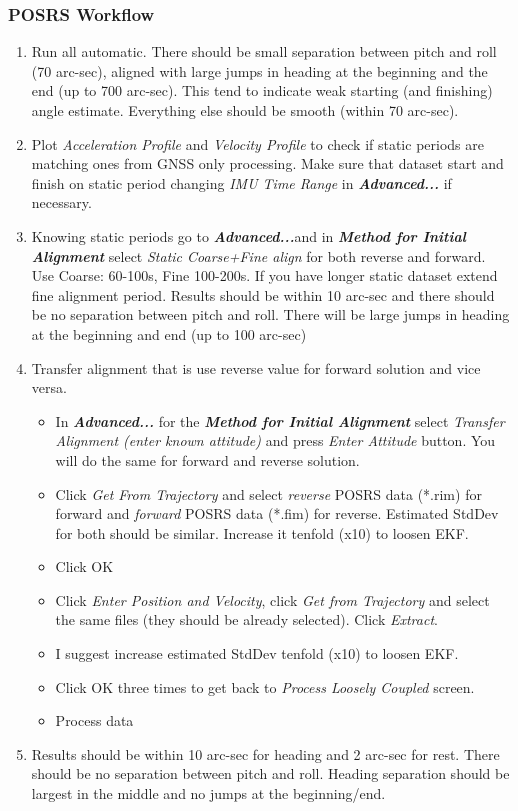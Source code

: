\documentclass[british,DIV=calc, paper=a4, fontsize=12pt, onecolumn]{scrartcl}
\begin{document}
\subsubsection{POSRS Workflow\label{sub:POSRS-Workflow}}

\begin{enumerate}
	\item Run all automatic. There should be small separation between pitch and roll (70 arc-sec), aligned with large jumps in heading at the beginning and the end (up to 700 arc-sec). This tend to indicate weak starting (and finishing) angle estimate. Everything else should be smooth (within 70 arc-sec).
	\item Plot \emph{Acceleration Profile} and \emph{Velocity Profile} to check if static periods are matching ones from GNSS only processing. Make sure that dataset start and finish on static period changing \textit{IMU Time Range} in \textbf{\emph{Advanced...}} if necessary.
	\item Knowing static periods go to \textbf{\emph{Advanced...}}and in \textbf{\emph{Method for Initial Alignment}} select \emph{Static Coarse+Fine align} for both reverse and forward. Use Coarse: 60-100s, Fine 100-200s. If you have longer static dataset extend fine alignment period. Results should be within 10 arc-sec and there should be no separation between pitch and roll. There will be large jumps in heading at the beginning and end (up to 100 arc-sec) 
	\item Transfer alignment that is use reverse value for forward solution and vice versa.
	\begin{itemize}
		\item In \textbf{\emph{Advanced...}} for the \textbf{\emph{Method for Initial Alignment}} select \emph{Transfer Alignment (enter known attitude) }and press\emph{ Enter Attitude }button. You will do the same for forward and reverse solution.
		\item Click \emph{Get From Trajectory }and select \emph{reverse} POSRS data ({*}.rim) for forward and \emph{forward} POSRS data ({*}.fim) for reverse. Estimated StdDev for both should be similar. Increase it tenfold (x10) to loosen EKF. 
		\item Click OK
		\item Click \emph{Enter Position and Velocity}, click \emph{ Get from Trajectory} and select the same files (they should be already selected). Click \emph{Extract}.
		\item I suggest increase estimated StdDev tenfold (x10) to loosen EKF. 
		\item Click OK three times to get back to \emph{Process Loosely Coupled} screen.
		\item Process data
	\end{itemize}
	\item Results should be within 10 arc-sec for heading and 2 arc-sec for rest. There should be no separation between pitch and roll. Heading separation should be largest in the middle and no jumps at the beginning/end. 
\end{enumerate}
\end{document}
